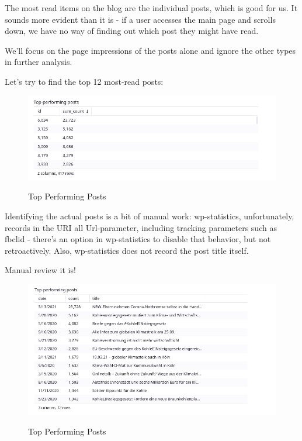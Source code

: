 The most read items on the blog are the individual posts, which is good for us. It sounds more evident than it is - if a user accesses the main page and scrolls down, we have no way of finding out which post they might have read.

We'll focus on the page impressions of the posts alone and ignore the other types in further analysis.

Let's try to find the top 12 most-read posts:

\begin{figure}[H]
\centering
\caption {Top Performing Posts}
\includegraphics[width=\linewidth]{images/figure12.png}
\label{fig:topPerforming}
\end{figure}

Identifying the actual posts is a bit of manual work: wp-statistics, unfortunately, records in the URI all Url-parameter, including tracking parameters such as fbclid - there's an option in wp-statistics to disable that behavior, but not retroactively. Also, wp-statistics does not record the post title itself. 

Manual review it is!

\begin{figure}[H]
\centering
\caption {Top Performing Posts}
\includegraphics[width=\linewidth]{images/figure13.png}
\label{fig:manualReview}
\end{figure}

